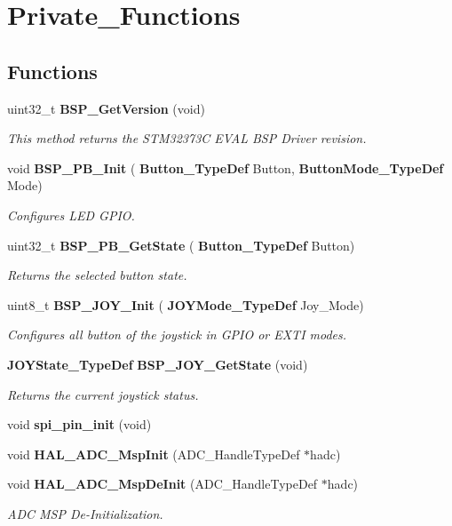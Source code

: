 \section{Private\+\_\+\+Functions}
\label{group___private___functions}
\subsection*{Functions}
\begin{DoxyCompactItemize}
\item 
uint32\+\_\+t \textbf{ B\+S\+P\+\_\+\+Get\+Version} (void)
\begin{DoxyCompactList}\small\item\em This method returns the S\+T\+M32373C E\+V\+AL B\+SP Driver revision. \end{DoxyCompactList}\item 
void \textbf{ B\+S\+P\+\_\+\+P\+B\+\_\+\+Init} (\textbf{ Button\+\_\+\+Type\+Def} Button, \textbf{ Button\+Mode\+\_\+\+Type\+Def} Mode)
\begin{DoxyCompactList}\small\item\em Configures L\+ED G\+P\+IO. \end{DoxyCompactList}\item 
uint32\+\_\+t \textbf{ B\+S\+P\+\_\+\+P\+B\+\_\+\+Get\+State} (\textbf{ Button\+\_\+\+Type\+Def} Button)
\begin{DoxyCompactList}\small\item\em Returns the selected button state. \end{DoxyCompactList}\item 
uint8\+\_\+t \textbf{ B\+S\+P\+\_\+\+J\+O\+Y\+\_\+\+Init} (\textbf{ J\+O\+Y\+Mode\+\_\+\+Type\+Def} Joy\+\_\+\+Mode)
\begin{DoxyCompactList}\small\item\em Configures all button of the joystick in G\+P\+IO or E\+X\+TI modes. \end{DoxyCompactList}\item 
\textbf{ J\+O\+Y\+State\+\_\+\+Type\+Def} \textbf{ B\+S\+P\+\_\+\+J\+O\+Y\+\_\+\+Get\+State} (void)
\begin{DoxyCompactList}\small\item\em Returns the current joystick status. \end{DoxyCompactList}\item 
void \textbf{ spi\+\_\+pin\+\_\+init} (void)
\item 
void \textbf{ H\+A\+L\+\_\+\+A\+D\+C\+\_\+\+Msp\+Init} (A\+D\+C\+\_\+\+Handle\+Type\+Def $\ast$hadc)
\item 
void \textbf{ H\+A\+L\+\_\+\+A\+D\+C\+\_\+\+Msp\+De\+Init} (A\+D\+C\+\_\+\+Handle\+Type\+Def $\ast$hadc)
\begin{DoxyCompactList}\small\item\em A\+DC M\+SP De-\/\+Initialization. \end{DoxyCompactList}\end{DoxyCompactItemize}


